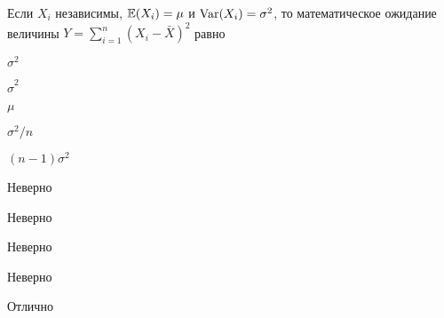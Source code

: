 
\begin{question}
Если \(X_i\) независимы, \(\operatorname{\mathbb{E}}(X_i)=\mu\) и \(\operatorname{Var}(X_i)=\sigma^2\), то
математическое ожидание величины \(Y=\sum_{i=1}^{n}(X_i-\bar{X})^2\)
равно
\begin{answerlist}
  \item \(\sigma^2\)
  \item \(\hat\sigma^2\)
  \item \(\mu\)
  \item \(\sigma^2/n\)
  \item \((n-1)\sigma^2\)
\end{answerlist}
\end{question}

\begin{solution}
\begin{answerlist}
  \item Неверно
  \item Неверно
  \item Неверно
  \item Неверно
  \item Отлично
\end{answerlist}
\end{solution}

